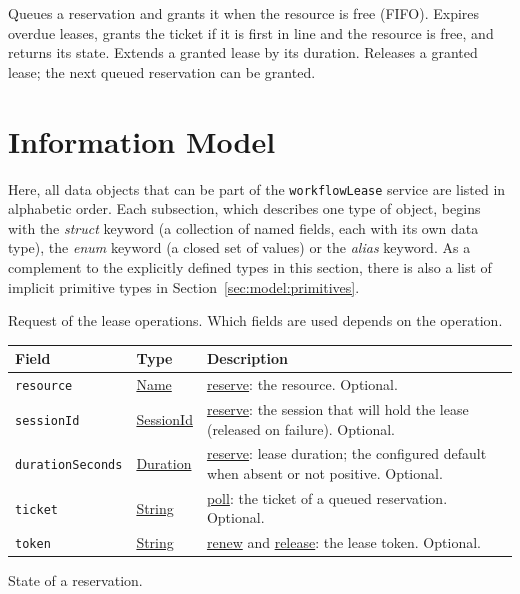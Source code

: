 \documentclass[a4paper]{arrowhead}
\newcommand{\oref}[1]{{\textcolor{ArrowheadBlue}{\hyperref[sec:operations:#1]{#1}}}}
\newcommand{\pref}[1]{{\textcolor{ArrowheadGrey}{\hyperref[sec:model:primitives:#1]{#1}}}}
\begin{document}
Queues a reservation and grants it when the resource is free (FIFO).
Expires overdue leases, grants the ticket if it is first in line and the resource is free, and returns its state.
Extends a granted lease by its duration.
Releases a granted lease; the next queued reservation can be granted.

\newpage
\section{Information Model}
\label{sec:model}
Here, all data objects that can be part of the \texttt{workflowLease} service are listed in alphabetic order. Each
subsection, which describes one type of object, begins with the \textit{struct} keyword (a collection of named fields,
each with its own data type), the \textit{enum} keyword (a closed set of values) or the \textit{alias} keyword. As a
complement to the explicitly defined types in this section, there is also a list of implicit primitive types in
Section~\ref{sec:model:primitives}.

Request of the lease operations. Which fields are used depends on the operation.

{\small
\begin{longtable}{|p{3.9cm}|p{4.4cm}|p{7.5cm}|}

\hline
\rowcolor{gray!33} Field & Type & Description \\ \hline
\endhead
\texttt{resource} & \pref{Name} & \oref{reserve}: the resource. Optional. \\ \hline
\texttt{sessionId} & \pref{SessionId} & \oref{reserve}: the session that will hold the lease (released on failure). Optional. \\ \hline
\texttt{duration\allowbreak{}Seconds} & \pref{Duration} & \oref{reserve}: lease duration; the configured default when absent or not positive. Optional. \\ \hline
\texttt{ticket} & \pref{String} & \oref{poll}: the ticket of a queued reservation. Optional. \\ \hline
\texttt{token} & \pref{String} & \oref{renew} and \oref{release}: the lease token. Optional. \\ \hline
\end{longtable}
}

State of a reservation.
\end{document}
